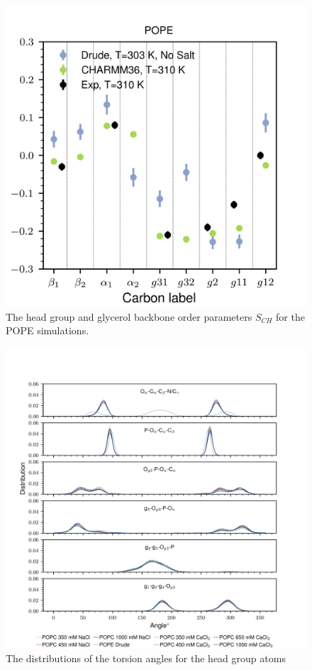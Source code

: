 \documentclass[journal=jacsat,manuscript=article,layout=singlecolumn]{achemso}
\begin{document}
\begin{figure}[!hbt]
	\centering
	\includegraphics{pope_order_parameters.png}
	\caption{The head group and glycerol backbone order parameters $S_{CH}$ for the POPE simulations.}
	\label{fig:pope_order}
\end{figure}

\begin{figure}[!hbt]
	\centering
	\includegraphics{dihedral_distributions_for_all.png}
	\caption{The distributions of the torsion angles for the head group atoms}
	\label{fig:dihedral}
\end{figure}
\end{document}
